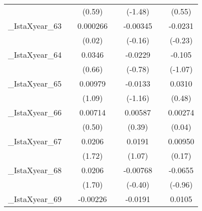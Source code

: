 {\begin{tabular}{l*{6}{c}}
            &                     &      (0.59)         &                     &     (-1.48)         &                     &      (0.55)         \\
[1em]
\_IstaXyear\_63&                     &    0.000266         &                     &    -0.00345         &                     &     -0.0231         \\
            &                     &      (0.02)         &                     &     (-0.16)         &                     &     (-0.23)         \\
[1em]
\_IstaXyear\_64&                     &      0.0346         &                     &     -0.0229         &                     &      -0.105         \\
            &                     &      (0.66)         &                     &     (-0.78)         &                     &     (-1.07)         \\
[1em]
\_IstaXyear\_65&                     &     0.00979         &                     &     -0.0133         &                     &      0.0310         \\
            &                     &      (1.09)         &                     &     (-1.16)         &                     &      (0.48)         \\
[1em]
\_IstaXyear\_66&                     &     0.00714         &                     &     0.00587         &                     &     0.00274         \\
            &                     &      (0.50)         &                     &      (0.39)         &                     &      (0.04)         \\
[1em]
\_IstaXyear\_67&                     &      0.0206         &                     &      0.0191         &                     &     0.00950         \\
            &                     &      (1.72)         &                     &      (1.07)         &                     &      (0.17)         \\
[1em]
\_IstaXyear\_68&                     &      0.0206         &                     &    -0.00768         &                     &     -0.0655         \\
            &                     &      (1.70)         &                     &     (-0.40)         &                     &     (-0.96)         \\
[1em]
\_IstaXyear\_69&                     &    -0.00226         &                     &     -0.0191         &                     &      0.0105         \\

\end{tabular}}
